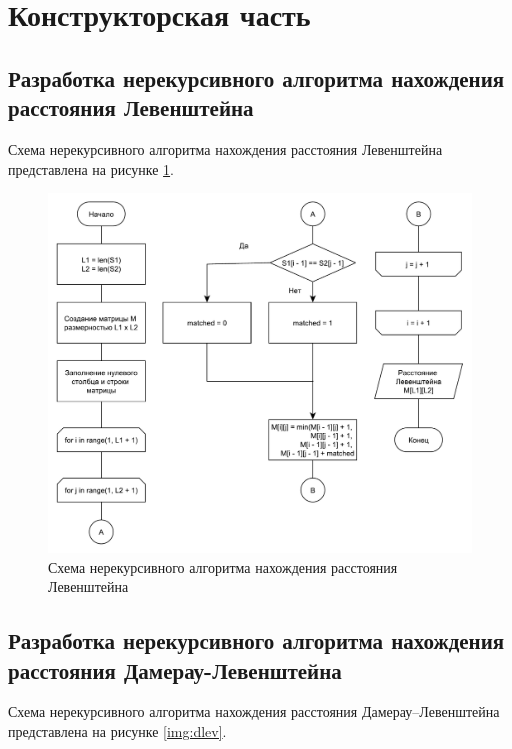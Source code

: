 \section{Конструкторская часть}

\subsection{Разработка нерекурсивного алгоритма нахождения расстояния Левенштейна}

Схема нерекурсивного алгоритма нахождения расстояния Левенштейна представлена на рисунке \ref{img:lev}.

\begin{figure}[h]
	\centering
	\includegraphics[scale=0.6]{images/lev.pdf}
	\caption{Схема нерекурсивного алгоритма нахождения расстояния Левенштейна}
	\label{img:lev}
\end{figure}

\newpage

\subsection{Разработка нерекурсивного алгоритма нахождения расстояния Дамерау-Левенштейна}

Схема нерекурсивного алгоритма нахождения расстояния Дамерау--Левенштейна представлена на рисунке \ref{img:dlev}.

